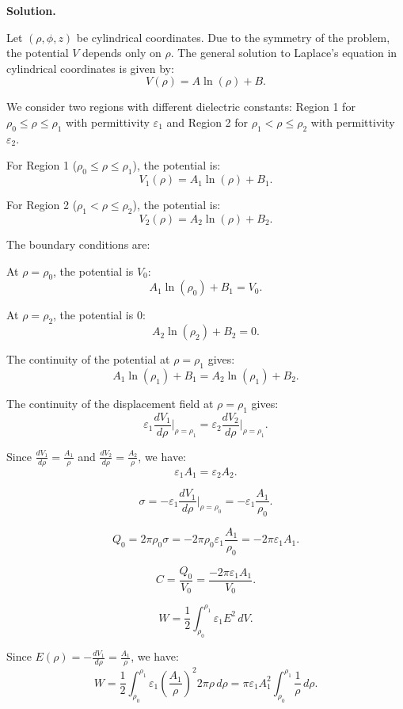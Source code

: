 \documentclass[12pt, a4paper, oneside]{report}
\newenvironment{solution}{
  \par\medskip\noindent
  \textbf{Solution.}\quad\itshape
  \par\noindent\makebox[\linewidth]{\rule{\textwidth}{0.4pt}}
}{
  \par\noindent\makebox[\linewidth]{\rule{\textwidth}{0.4pt}}
  \par\medskip
}
\begin{document}
\begin{solution}

Let \((\rho, \phi, z)\) be cylindrical coordinates. Due to the symmetry of the problem, the potential \(V\) depends only on \(\rho\). The general solution to Laplace's equation in cylindrical coordinates is given by:
\[
V(\rho) = A \ln(\rho) + B.
\]

We consider two regions with different dielectric constants: Region 1 for \(\rho_0 \le \rho \le \rho_1\) with permittivity \(\varepsilon_1\) and Region 2 for \(\rho_1 < \rho \le \rho_2\) with permittivity \(\varepsilon_2\).

For Region 1 (\(\rho_0 \le \rho \le \rho_1\)), the potential is:
\[
V_1(\rho) = A_1 \ln(\rho) + B_1.
\]

For Region 2 (\(\rho_1 < \rho \le \rho_2\)), the potential is:
\[
V_2(\rho) = A_2 \ln(\rho) + B_2.
\]

The boundary conditions are:

At \(\rho = \rho_0\), the potential is \(V_0\):
\[
A_1 \ln(\rho_0) + B_1 = V_0.
\]

At \(\rho = \rho_2\), the potential is \(0\):
\[
A_2 \ln(\rho_2) + B_2 = 0.
\]

The continuity of the potential at \(\rho = \rho_1\) gives:
\[
A_1 \ln(\rho_1) + B_1 = A_2 \ln(\rho_1) + B_2.
\]

The continuity of the displacement field at \(\rho = \rho_1\) gives:
\[
\varepsilon_1 \frac{dV_1}{d\rho}\Big|_{\rho=\rho_1} = \varepsilon_2 \frac{dV_2}{d\rho}\Big|_{\rho=\rho_1}.
\]

Since \(\frac{dV_1}{d\rho} = \frac{A_1}{\rho}\) and \(\frac{dV_2}{d\rho} = \frac{A_2}{\rho}\), we have:
\[
\varepsilon_1 A_1 = \varepsilon_2 A_2.
\]

\[
\sigma = -\varepsilon_1 \frac{dV_1}{d\rho}\Big|_{\rho=\rho_0} = -\varepsilon_1 \frac{A_1}{\rho_0}.
\]

\[
Q_0 = 2 \pi \rho_0 \sigma = -2 \pi \rho_0 \varepsilon_1 \frac{A_1}{\rho_0} = -2 \pi \varepsilon_1 A_1.
\]

\[
C = \frac{Q_0}{V_0} = \frac{-2 \pi \varepsilon_1 A_1}{V_0}.
\]

\[
W = \frac{1}{2} \int_{\rho_0}^{\rho_1} \varepsilon_1 E^2 \, dV.
\]

Since \(E(\rho) = -\frac{dV_1}{d\rho} = \frac{A_1}{\rho}\), we have:
\[
W = \frac{1}{2} \int_{\rho_0}^{\rho_1} \varepsilon_1 \left( \frac{A_1}{\rho} \right)^2 2 \pi \rho \, d\rho = \pi \varepsilon_1 A_1^2 \int_{\rho_0}^{\rho_1} \frac{1}{\rho} \, d\rho.
\]


\end{solution}
\end{document}
